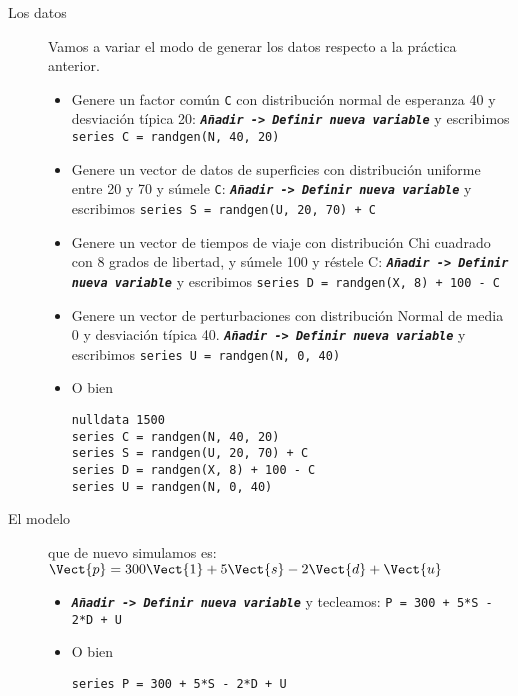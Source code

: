 \documentclass[11pt]{article}
\begin{document}
\begin{description}
\item[{Los datos}] Vamos a variar el modo de generar los datos respecto a la práctica anterior.

\begin{itemize}
\item Genere un factor común \texttt{C} con distribución normal de esperanza 40
y desviación típica 20: \textbf{\emph{\texttt{Añadir -> Definir nueva variable}}} y
escribimos \texttt{series C = randgen(N, 40, 20)}

\item Genere un vector de datos de superficies con distribución uniforme
entre 20 y 70 y súmele \texttt{C}: \textbf{\emph{\texttt{Añadir
    -> Definir nueva variable}}} y escribimos \texttt{series S = randgen(U, 20, 70) + C}

\item Genere un vector de tiempos de viaje con distribución Chi cuadrado
con 8 grados de libertad, y súmele 100 y réstele C: \textbf{\emph{\texttt{Añadir ->
    Definir nueva variable}}} y escribimos \texttt{series D = randgen(X, 8) +
    100 - C}

\item Genere un vector de perturbaciones con distribución Normal de
media 0 y desviación típica 40. \textbf{\emph{\texttt{Añadir -> Definir nueva
    variable}}} y escribimos \texttt{series U = randgen(N, 0, 40)}

\item O bien
\begin{verbatim}
nulldata 1500
series C = randgen(N, 40, 20)
series S = randgen(U, 20, 70) + C
series D = randgen(X, 8) + 100 - C
series U = randgen(N, 0, 40)
\end{verbatim}
\end{itemize}
\end{description}


\begin{description}
\item[{El modelo}] que de nuevo simulamos es: \(\Vect{p} = 300\Vect{1} +
  5\Vect{s} - 2\Vect{d} + \Vect{u}\)

\begin{itemize}
\item \textbf{\emph{\texttt{Añadir -> Definir nueva variable}}} y tecleamos: \texttt{P = 300 + 5*S - 2*D + U}

\item O bien 
\begin{verbatim}
series P = 300 + 5*S - 2*D + U
\end{verbatim}
\end{itemize}
\end{description}
\end{document}
